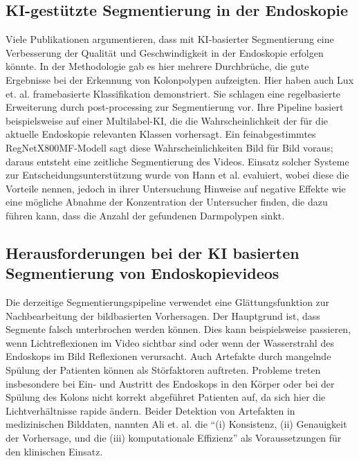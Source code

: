 \subsection{KI-gestützte Segmentierung in der Endoskopie}

Viele Publikationen argumentieren, dass mit KI-basierter Segmentierung eine Verbesserung der Qualität und Geschwindigkeit in der Endoskopie erfolgen könnte. \cite{ELKarazle2023} In der Methodologie gab es hier mehrere Durchbrüche, die gute Ergebnisse bei der Erkennung von Kolonpolypen aufzeigten. \cite{Fan2020}\cite{Dong2021} Hier haben auch Lux et. al. framebasierte Klassifikation demonstriert. Sie schlagen  eine regelbasierte Erweiterung durch post-processing zur Segmentierung vor. Ihre Pipeline basiert beispielsweise auf einer Multilabel-KI, die die Wahrscheinlichkeit der für die aktuelle Endoskopie relevanten Klassen vorhersagt. Ein feinabgestimmtes RegNetX800MF-Modell sagt diese Wahrscheinlichkeiten Bild für Bild voraus; daraus entsteht eine zeitliche Segmentierung des Videos. \cite{lux-2023} Einsatz solcher Systeme zur Entscheidungsunterstützung wurde von Hann et al. evaluiert, wobei diese die Vorteile nennen, jedoch in ihrer Untersuchung Hinweise auf negative Effekte wie eine mögliche Abnahme der Konzentration der Untersucher finden, die dazu führen kann, dass die Anzahl der gefundenen Darmpolypen sinkt. \cite{hann_entscheidungsunterstutzung_2025}


\subsection{Herausforderungen bei der KI basierten Segmentierung von Endoskopievideos}

Die derzeitige Segmentierungspipeline verwendet eine Glättungsfunktion zur Nachbearbeitung der bildbasierten Vorhersagen. Der Hauptgrund ist, dass Segmente falsch unterbrochen werden können. Dies kann beispielsweise passieren, wenn Lichtreflexionen im Video sichtbar sind oder wenn der Wasserstrahl des Endoskops im Bild Reflexionen verursacht. Auch Artefakte durch mangelnde Spülung der Patienten können als Störfaktoren auftreten. 
Probleme treten insbesondere bei Ein- und Austritt des Endoskops in den Körper oder bei der Spülung des Kolons nicht korrekt abgeführet Patienten auf, da sich hier die Lichtverhältnisse rapide ändern. Beider Detektion von Artefakten in medizinischen Bilddaten, nannten Ali et. al. die \enquote{(i) Konsistenz, (ii) Genauigkeit der Vorhersage, und die (iii)
komputationale Effizienz} als Voraussetzungen für den klinischen Einsatz. \cite{Ali2020}


